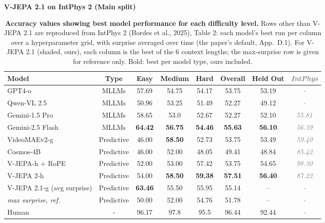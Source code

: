\documentclass[10pt]{article}
\newcommand{\gr}[1]{\textcolor{gray}{\textit{#1}}}
\begin{document}
\begin{center}
{\large\bfseries V-JEPA 2.1 on IntPhys 2 (Main split)}
\end{center}

\begin{table}[h]
\centering
\caption{\textbf{Accuracy values showing best model performance for each difficulty level.}
Rows other than V-JEPA 2.1 are reproduced from IntPhys 2 (Bordes et al., 2025), Table 2: each model's best run per
column over a hyperparameter grid, with surprise averaged over time (the paper's default, App.~D.1). For
V-JEPA 2.1 (shaded, ours), each column is the best of the 6 context lengths; the max-surprise row is given for
reference only. Bold: best per model type, ours included.}
\small
\begin{tabular}{l|c|ccc|c||c|c}
\toprule
Model & Type & Easy & Medium & Hard & Overall & Held Out & \gr{IntPhys} \\
\midrule
GPT4-o & MLLMs & 57.69 & 54.75 & 54.17 & 53.75 & 53.19 & \gr{-} \\
Qwen-VL 2.5 & MLLMs & 50.96 & 53.25 & 51.49 & 52.27 & 49.12 & \gr{-} \\
Gemini-1.5 Pro & MLLMs & 58.65 & 53.0 & 52.67 & 52.27 & 52.10 & \gr{55.81} \\
Gemini-2.5 Flash & MLLMs & \textbf{64.42} & \textbf{56.75} & \textbf{54.46} & \textbf{55.63} & \textbf{56.10} & \gr{56.39} \\
\midrule
VideoMAEv2-g & Predictive & 46.00 & \textbf{58.50} & 52.73 & 53.75 & 53.49 & \gr{59.40} \\
Cosmos-4B & Predictive & 46.00 & 52.00 & 48.05 & 49.41 & 48.84 & \gr{85.42} \\
V-JEPA-h + RoPE & Predictive & 52.00 & 53.00 & 57.42 & 53.75 & 54.65 & \gr{98.30} \\
V-JEPA 2-h & Predictive & 54.00 & \textbf{58.50} & \textbf{59.38} & \textbf{57.51} & \textbf{56.40} & \gr{87.22} \\
\rowcolor{ours}
V-JEPA 2.1-g (avg surprise) & Predictive & \textbf{63.46} & 55.50 & 55.95 & 55.14 & -- & \gr{-} \\
\rowcolor{ours}
\quad\textit{max surprise, ref.} & Predictive & 50.00 & 52.00 & 54.76 & 51.78 & -- & \gr{-} \\
\midrule
Human & - & 96.17 & 97.8 & 95.5 & 96.44 & 92.44 & \gr{-} \\
\bottomrule
\end{tabular}
\end{table}
\end{document}

